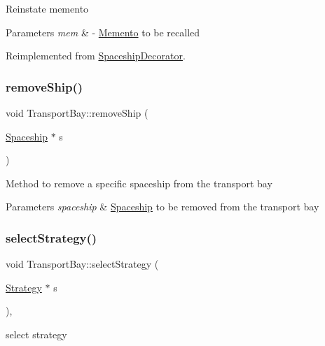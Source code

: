 Reinstate memento 
\begin{DoxyParams}{Parameters}
{\em mem} & -\/ \hyperlink{classMemento}{Memento} to be recalled \\
\hline
\end{DoxyParams}


Reimplemented from \hyperlink{classSpaceshipDecorator_ac043134e491d99a8e0d985d7ce409a87}{Spaceship\+Decorator}.

\mbox{\label{classTransportBay_a053ab5bbf5b6cafe1f5b3782176bd214}} 
\subsubsection{\texorpdfstring{remove\+Ship()}{removeShip()}}
{\footnotesize\ttfamily void Transport\+Bay\+::remove\+Ship (\begin{DoxyParamCaption}\item[{\hyperlink{classSpaceship}{Spaceship} $\ast$}]{s }\end{DoxyParamCaption})}

Method to remove a specific spaceship from the transport bay 
\begin{DoxyParams}{Parameters}
{\em spaceship} & \hyperlink{classSpaceship}{Spaceship} to be removed from the transport bay \\
\hline
\end{DoxyParams}
\mbox{\label{classTransportBay_a277ec0488bbafbeef8d25a77dc5576c8}} 
\subsubsection{\texorpdfstring{select\+Strategy()}{selectStrategy()}}
{\footnotesize\ttfamily void Transport\+Bay\+::select\+Strategy (\begin{DoxyParamCaption}\item[{\hyperlink{classStrategy}{Strategy} $\ast$}]{s }\end{DoxyParamCaption})\hspace{0.3cm}{\ttfamily [inline]}, {\ttfamily [virtual]}}

select strategy 

